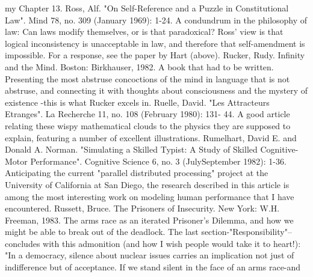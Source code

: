  my Chapter 13.
Ross, Alf. "On Self-Reference and a Puzzle in Constitutional Law". Mind 78, no. 309
 (January 1969): 1-24. A condundrum in the philosophy of law: Can laws modify
 themselves, or is that paradoxical? Ross' view is that logical inconsistency is unacceptable
 in law, and therefore that self-amendment is impossible. For a response, see the paper by
 Hart (above).
Rucker, Rudy. Infinity and the Mind. Boston: Birkhauser, 1982. A book that had to be
 written. Presenting the most abstruse concoctions of the mind in language that is not
 abstruse, and connecting it with thoughts about consciousness and the mystery of existence
 -this is what Rucker excels in.
Ruelle, David. "Les Attracteurs Etranges". La Recherche 11, no. 108 (February 1980): 131-
 44. A good article relating these wispy mathematical clouds to the physics they are
 supposed to explain, featuring a number of excellent illustrations.
Rumelhart, David E. and Donald A. Norman. "Simulating a Skilled Typist: A Study of
 Skilled Cognitive-Motor Performance". Cognitive Science 6, no. 3 (JulySeptember 1982):
 1-36. Anticipating the current "parallel distributed processing" project at the University of
 California at San Diego, the research described in this article is among the most interesting
 work on modeling human performance that I have encountered.
Russett, Bruce. The Prisoners of Insecurity. New York: W.H. Freeman, 1983. The arms race
 as an iterated Prisoner's Dilemma, and how we might be able to break out of the deadlock.
 The last section-"Responsibility"--concludes with this admonition (and how I wish people
 would take it to heart!): "In a democracy, silence about nuclear issues carries an implication
 not just of indifference but of acceptance. If we stand silent in the face of an arms race-and


